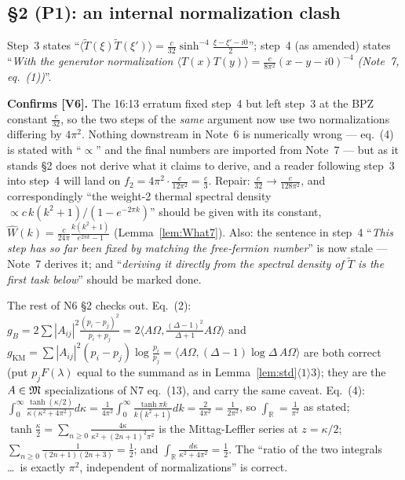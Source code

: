\documentclass[11pt]{article}
\newcommand{\Wh}{\widehat W}\newcommand{\gh}{\widehat{\widetilde g}}\newcommand{\gt}{\widetilde g}\newcommand{\Diff}{\mathrm{Diff}}
\begin{document}
\subsection{\S2 (P1): an internal normalization clash}
\begin{issue}
Step~3 states ``$\langle\widetilde T(\xi)\widetilde T(\xi')\rangle=\frac c{32}\sinh^{-4}\frac{\xi-\xi'-i0}2$'';
step~4 (as amended) states ``\emph{With the generator normalization $\langle T(x)T(y)\rangle=\frac c{8\pi^2}(x-y-i0)^{-4}$
(Note~7, eq.~(1))}''.
\end{issue}
\begin{verdictbreak}
\textbf{Confirms [V6].}  The 16:13 erratum fixed step~4 but left step~3 at the BPZ constant $\frac c{32}$, so the
two steps of the \emph{same} argument now use two normalizations differing by $4\pi^2$.  Nothing downstream in
Note~6 is numerically wrong --- eq.~(4) is stated with ``$\propto$'' and the final numbers are imported from
Note~7 --- but as it stands \S2 does not derive what it claims to derive, and a reader following step~3 into
step~4 will land on $f_2=4\pi^2\cdot\frac c{12\pi^2}=\frac c3$.  Repair: $\frac c{32}\to\frac c{128\pi^2}$, and
correspondingly ``the weight-2 thermal spectral density $\propto c\,k(k^2+1)/(1-e^{-2\pi k})$'' should be given
with its constant, $\Wh(k)=\frac c{24\pi}\frac{k(k^2+1)}{e^{2\pi k}-1}$ (Lemma~\ref{lem:What7}).  Also: the
sentence in step~4 ``\emph{This step has so far been fixed by matching the free-fermion number}'' is now stale ---
Note~7 derives it; and ``\emph{deriving it directly from the spectral density of $\widetilde T$ is the first task
below}'' should be marked done.
\end{verdictbreak}
\begin{verdictok}
The rest of N6 \S2 checks out.  Eq.~(2): $g_B=2\sum|A_{ij}|^2\frac{(p_i-p_j)^2}{p_i+p_j}=2\langle A\Omega,\frac{(\Delta-1)^2}{\Delta+1}A\Omega\rangle$
and $g_{\mathrm{KM}}=\sum|A_{ij}|^2(p_i-p_j)\log\frac{p_i}{p_j}=\langle A\Omega,(\Delta-1)\log\Delta\,A\Omega\rangle$
are both correct (put $p_jF(\lambda)$ equal to the summand as in Lemma~\ref{lem:std}$\langle1\rangle3$);
they are the $A\in\mathfrak M$ specializations of N7 eq.~(13), and carry the same caveat.
Eq.~(4): $\int_0^\infty\frac{\tanh(\kappa/2)}{\kappa(\kappa^2+4\pi^2)}d\kappa=\frac1{4\pi^2}\int_0^\infty\frac{\tanh\pi k}{k(k^2+1)}dk=\frac2{4\pi^2}=\frac1{2\pi^2}$,
so $\int_{\mathbb R}=\frac1{\pi^2}$ as stated; $\tanh\frac\kappa2=\sum_{n\ge0}\frac{4\kappa}{\kappa^2+(2n+1)^2\pi^2}$
is the Mittag-Leffler series at $z=\kappa/2$; $\sum_{n\ge0}\frac1{(2n+1)(2n+3)}=\frac12$; and
$\int_{\mathbb R}\frac{d\kappa}{\kappa^2+4\pi^2}=\frac12$.  The ``ratio of the two integrals \dots\ is exactly
$\pi^2$, independent of normalizations'' is correct.
\end{verdictok}
\end{document}
